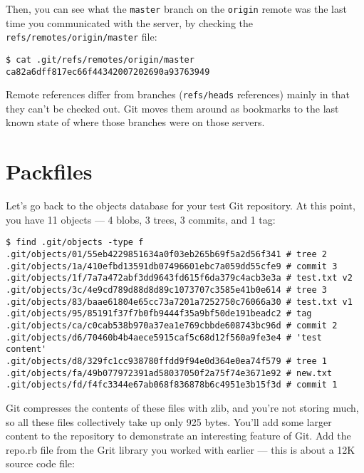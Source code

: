 \documentclass[a4paper]{book}
\newcounter{tab}[chapter]
\begin{document}
Then, you can see what the \texttt{master} branch on the \texttt{origin} remote was the last time you communicated with the server, by checking the \texttt{refs/remotes/origin/master} file:

\begin{shaded}\begin{verbatim}
$ cat .git/refs/remotes/origin/master
ca82a6dff817ec66f44342007202690a93763949
\end{verbatim}\end{shaded}

Remote references differ from branches (\texttt{refs/heads} references) mainly in that they can't be checked out. Git moves them around as bookmarks to the last known state of where those branches were on those servers.

\section{Packfiles}

Let's go back to the objects database for your test Git repository. At this point, you have 11 objects --- 4 blobs, 3 trees, 3 commits, and 1 tag:

\begin{shaded}\begin{verbatim}
$ find .git/objects -type f
.git/objects/01/55eb4229851634a0f03eb265b69f5a2d56f341 # tree 2
.git/objects/1a/410efbd13591db07496601ebc7a059dd55cfe9 # commit 3
.git/objects/1f/7a7a472abf3dd9643fd615f6da379c4acb3e3a # test.txt v2
.git/objects/3c/4e9cd789d88d8d89c1073707c3585e41b0e614 # tree 3
.git/objects/83/baae61804e65cc73a7201a7252750c76066a30 # test.txt v1
.git/objects/95/85191f37f7b0fb9444f35a9bf50de191beadc2 # tag
.git/objects/ca/c0cab538b970a37ea1e769cbbde608743bc96d # commit 2
.git/objects/d6/70460b4b4aece5915caf5c68d12f560a9fe3e4 # 'test content'
.git/objects/d8/329fc1cc938780ffdd9f94e0d364e0ea74f579 # tree 1
.git/objects/fa/49b077972391ad58037050f2a75f74e3671e92 # new.txt
.git/objects/fd/f4fc3344e67ab068f836878b6c4951e3b15f3d # commit 1
\end{verbatim}\end{shaded}

Git compresses the contents of these files with zlib, and you're not storing much, so all these files collectively take up only 925 bytes. You'll add some larger content to the repository to demonstrate an interesting feature of Git. Add the repo.rb file from the Grit library you worked with earlier --- this is about a 12K source code file:
\end{document}
